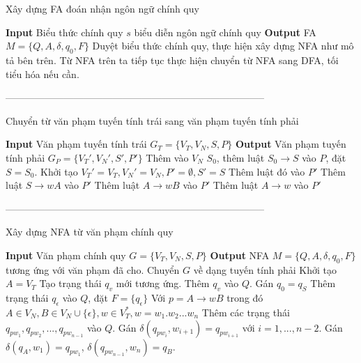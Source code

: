 \documentclass[14pt]{extreport}
\begin{document}
\begin{algorithm}[H]
\caption{Xây dựng FA đoán nhận ngôn ngữ chính quy}
\begin{algorithmic} 
\STATE \textbf{Input} Biểu thức chính quy $s$ biểu diễn ngôn ngữ chính quy
\STATE \textbf{Output} FA $M = \{Q, A, \delta, q_0, F\}$
\STATE Duyệt biểu thức chính quy, thực hiện xây dựng NFA như mô tả bên trên.
\STATE Từ NFA trên ta tiếp tục thực hiện chuyển từ NFA sang DFA, tối tiểu hóa nếu cần.
\end{algorithmic}
\end{algorithm}
--------------------------------------------------------------------------------\\
\begin{algorithm}[H]
\caption{Chuyển từ văn phạm tuyến tính trái sang văn phạm tuyến tính phải}
\begin{algorithmic} 
\STATE \textbf{Input} Văn phạm tuyến tính trái $G_T = \{V_T, V_N, S, P\}$
\STATE \textbf{Output} Văn phạm tuyến tính phải $G_P = \{V_T', V_N', S', P'\}$
\STATE Thêm vào $V_N$ $S_0$, thêm luật $S_0 \rightarrow S$ vào $P$, đặt $S = S_0$.
\ENDIF
\STATE Khởi tạo $V_T' = V_T, V_N' = V_N, P' = \emptyset, S' = S$
\STATE Thêm luật đó vào $P'$
\STATE Thêm luật $S \rightarrow wA$ vào $P'$
\STATE Thêm luật $A \rightarrow wB$ vào $P'$
\STATE Thêm luật $A \rightarrow w$ vào $P'$
\ENDIF
\ENDFOR
\end{algorithmic}
\end{algorithm}

--------------------------------------------------------------------------------\\
\begin{algorithm}[H]
\caption{Xây dựng NFA từ văn phạm chính quy}
\begin{algorithmic} 
\STATE \textbf{Input} Văn phạm chính quy $G = \{V_T, V_N, S, P\}$
\STATE \textbf{Output} NFA $M = \{Q, A, \delta, q_0, F\}$ tương ứng với văn phạm đã cho.
\STATE Chuyển $G$ về dạng tuyến tính phải
\ENDIF
\STATE Khởi tạo $A = V_T$
\STATE Tạo trạng thái $q_{v}$ mới tương ứng.
\STATE Thêm $q_{v}$ vào $Q$.
\ENDFOR
\STATE Gán $q_0 = q_S$
\STATE Thêm trạng thái $q_\epsilon$ vào $Q$, đặt $F = \{q_\epsilon\}$
\STATE Với $p = A \rightarrow wB$ trong đó $A \in V_N, B \in V_N \cup \{\epsilon\}, w \in V_T^*, w = w_1.w_2...w_n$
\STATE Thêm các trạng thái $q_{pw_1}, q_{pw_2}, ..., q_{pw_{n-1}}$ vào $Q$.
\STATE Gán $\delta(q_{pw_i}, w_{i+1}) = q_{pw_{i+1}}$ với $i=1,...,n-2$.
\STATE Gán $\delta(q_A, w_1) = q_{pw_1}$, $\delta(q_{pw_{n-1}}, w_n) = q_B$.
\ENDFOR
\end{algorithmic}
\end{algorithm}
\end{document}
